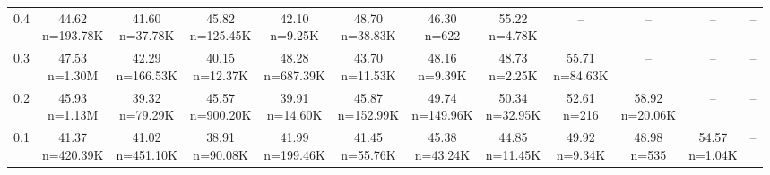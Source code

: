 \begin{table}
\begin{tabular}{lccccccccccc}
0.4 & \makecell{44.62 \\ \scriptsize n=193.78K} & \makecell{41.60 \\ \scriptsize n=37.78K} & \makecell{45.82 \\ \scriptsize n=125.45K} & \makecell{42.10 \\ \scriptsize n=9.25K} & \makecell{48.70 \\ \scriptsize n=38.83K} & \makecell{46.30 \\ \scriptsize n=622} & \makecell{55.22 \\ \scriptsize n=4.78K} & -- & -- & -- & -- \\
0.3 & \makecell{47.53 \\ \scriptsize n=1.30M} & \makecell{42.29 \\ \scriptsize n=166.53K} & \makecell{40.15 \\ \scriptsize n=12.37K} & \makecell{48.28 \\ \scriptsize n=687.39K} & \makecell{43.70 \\ \scriptsize n=11.53K} & \makecell{48.16 \\ \scriptsize n=9.39K} & \makecell{48.73 \\ \scriptsize n=2.25K} & \makecell{55.71 \\ \scriptsize n=84.63K} & -- & -- & -- \\
0.2 & \makecell{45.93 \\ \scriptsize n=1.13M} & \makecell{39.32 \\ \scriptsize n=79.29K} & \makecell{45.57 \\ \scriptsize n=900.20K} & \makecell{39.91 \\ \scriptsize n=14.60K} & \makecell{45.87 \\ \scriptsize n=152.99K} & \makecell{49.74 \\ \scriptsize n=149.96K} & \makecell{50.34 \\ \scriptsize n=32.95K} & \makecell{52.61 \\ \scriptsize n=216} & \makecell{58.92 \\ \scriptsize n=20.06K} & -- & -- \\
0.1 & \makecell{41.37 \\ \scriptsize n=420.39K} & \makecell{41.02 \\ \scriptsize n=451.10K} & \makecell{38.91 \\ \scriptsize n=90.08K} & \makecell{41.99 \\ \scriptsize n=199.46K} & \makecell{41.45 \\ \scriptsize n=55.76K} & \makecell{45.38 \\ \scriptsize n=43.24K} & \makecell{44.85 \\ \scriptsize n=11.45K} & \makecell{49.92 \\ \scriptsize n=9.34K} & \makecell{48.98 \\ \scriptsize n=535} & \makecell{54.57 \\ \scriptsize n=1.04K} & -- \\

\end{tabular}
\end{table}
